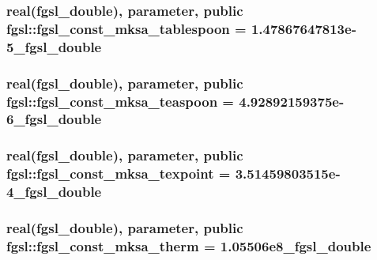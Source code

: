 \hypertarget{classfgsl_abb32761f02e5a238d65d6c3e48c1c2b9}{
\subsubsection[{fgsl\-\_\-const\-\_\-mksa\-\_\-tablespoon}]{\setlength{\rightskip}{0pt plus 5cm}real({\bf fgsl\-\_\-double}), parameter, public fgsl\-::fgsl\-\_\-const\-\_\-mksa\-\_\-tablespoon = 1.\-47867647813e-\/5\-\_\-fgsl\-\_\-double}}\label{classfgsl_abb32761f02e5a238d65d6c3e48c1c2b9}
\hypertarget{classfgsl_aa58032e706375dbeb56727446a0ffea1}{
\subsubsection[{fgsl\-\_\-const\-\_\-mksa\-\_\-teaspoon}]{\setlength{\rightskip}{0pt plus 5cm}real({\bf fgsl\-\_\-double}), parameter, public fgsl\-::fgsl\-\_\-const\-\_\-mksa\-\_\-teaspoon = 4.\-92892159375e-\/6\-\_\-fgsl\-\_\-double}}\label{classfgsl_aa58032e706375dbeb56727446a0ffea1}
\hypertarget{classfgsl_a962d8da1f8bc62c2323777660898e316}{
\subsubsection[{fgsl\-\_\-const\-\_\-mksa\-\_\-texpoint}]{\setlength{\rightskip}{0pt plus 5cm}real({\bf fgsl\-\_\-double}), parameter, public fgsl\-::fgsl\-\_\-const\-\_\-mksa\-\_\-texpoint = 3.\-51459803515e-\/4\-\_\-fgsl\-\_\-double}}\label{classfgsl_a962d8da1f8bc62c2323777660898e316}
\hypertarget{classfgsl_ae80985230902a792be876b10eac1a358}{
\subsubsection[{fgsl\-\_\-const\-\_\-mksa\-\_\-therm}]{\setlength{\rightskip}{0pt plus 5cm}real({\bf fgsl\-\_\-double}), parameter, public fgsl\-::fgsl\-\_\-const\-\_\-mksa\-\_\-therm = 1.\-05506e8\-\_\-fgsl\-\_\-double}}\label{classfgsl_ae80985230902a792be876b10eac1a358}
